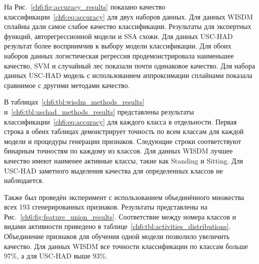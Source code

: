 На Рис.~\ref{ch6:fig:accuracy_results} показано качество классификации~\eqref{ch6:eq:accuracy} для двух наборов данных.
Для данных WISDM сплайны дали самое слабое качество классификации.
Результаты для экспертных функций, авторегрессионной модели и SSA схожи.
Для данных USC-HAD результат более восприимчив к выбору модели классификации. 
Для обоих наборов данных логистическая регрессия продемонстрировала наименьшее качество, SVM и случайный лес показали почти одинаковое качество.
Для набора данных USC-HAD модель с использованием аппроксимации сплайнами
показала сравнимое с другими методами качество. 

В таблицах~\ref{ch6:tbl:wisdm_methods_results} и~\ref{ch6:tbl:uschad_methods_results} представлены результаты классификации~\eqref{ch6:eq:accuracy} для каждого класса в отдельности.
Первая строка в обеих таблицах демонстрирует точность по всем классам для каждой модели и процедуры генерации признаков.
Следующие строки соответствуют бинарным точностям по каждому из классов.
Для данных WISDM лучшее качество имеют наименее активные классы, такие как Standing и Sitting. 
Для USC-HAD заметного выделения качества для определенных классов не наблюдается.

Также был проведён эксперимент с использованием объединённого множества всех 193 сгенерированных признаков.
Результаты представлены на Рис.~\ref{ch6:fig:feature_union_results}. Соответствие между номера классов и видами активности приведено в таблице~\ref{ch6:tbl:activities_distributions}. 
Объединение признаков для обучения одной модели позволило увеличить качество. 
Для данных WISDM все точности классификации по классам больше $97 \%$, а для USC-HAD выше $93 \%$.
